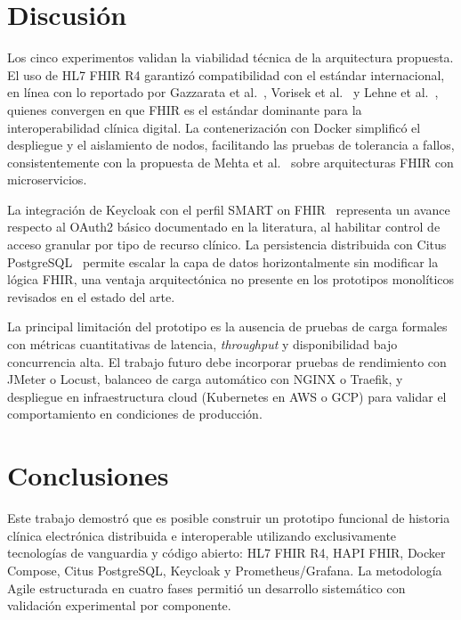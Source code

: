 \documentclass[conference]{IEEEtran}
\begin{document}
\section{Discusi\'on}

Los cinco experimentos validan la viabilidad t\'ecnica de la
arquitectura propuesta. El uso de HL7 FHIR R4 garantiz\'o
compatibilidad con el est\'andar internacional, en l\'inea con lo
reportado por Gazzarata et al.~\cite{b3}, Vorisek et al.~\cite{b2}
y Lehne et al.~\cite{blehne}, quienes convergen en que FHIR es el
est\'andar dominante para la interoperabilidad cl\'inica digital.
La contenerizaci\'on con Docker simplific\'o el despliegue y el
aislamiento de nodos, facilitando las pruebas de tolerancia a fallos,
consistentemente con la propuesta de Mehta et al.~\cite{bmehta} sobre
arquitecturas FHIR con microservicios.

La integraci\'on de Keycloak con el perfil SMART on FHIR~\cite{bsmart}
representa un avance respecto al OAuth2 b\'asico documentado en la
literatura, al habilitar control de acceso granular por tipo de recurso
cl\'inico. La persistencia distribuida con Citus PostgreSQL~\cite{b6,b7}
permite escalar la capa de datos horizontalmente sin modificar la
l\'ogica FHIR, una ventaja arquitect\'onica no presente en los
prototipos monol\'iticos revisados en el estado del arte.

La principal limitaci\'on del prototipo es la ausencia de pruebas de
carga formales con m\'etricas cuantitativas de latencia, \textit{throughput}
y disponibilidad bajo concurrencia alta. El trabajo futuro debe
incorporar pruebas de rendimiento con JMeter o Locust, balanceo de
carga autom\'atico con NGINX o Traefik, y despliegue en infraestructura
cloud (Kubernetes en AWS o GCP) para validar el comportamiento en
condiciones de producci\'on.

\section{Conclusiones}

Este trabajo demostr\'o que es posible construir un prototipo funcional
de historia cl\'inica electr\'onica distribuida e interoperable
utilizando exclusivamente tecnolog\'ias de vanguardia y c\'odigo
abierto: HL7 FHIR R4, HAPI FHIR, Docker Compose, Citus PostgreSQL,
Keycloak y Prometheus/Grafana. La metodolog\'ia Agile estructurada
en cuatro fases permiti\'o un desarrollo sistem\'atico con validaci\'on
experimental por componente.
\end{document}
